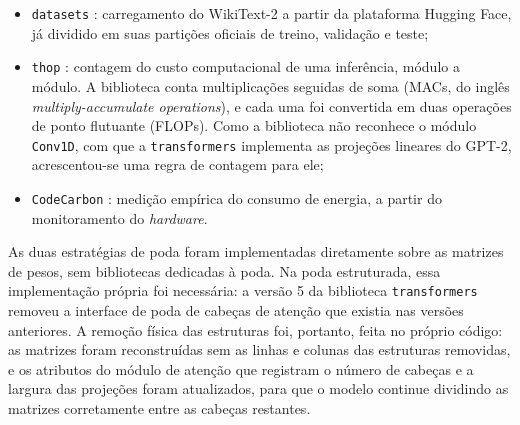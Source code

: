 \begin{itemize}
    \item \texttt{datasets} \cite{Lhoest2021}: carregamento do WikiText-2 a partir da
          plataforma Hugging Face, já dividido em suas partições oficiais de treino,
          validação e teste;
    \item \texttt{thop} \cite{Zhu2022}: contagem do custo computacional de uma inferência,
          módulo a módulo. A biblioteca conta multiplicações seguidas de
          soma (MACs, do inglês \textit{multiply-accumulate operations}), e cada uma foi
          convertida em duas operações de ponto flutuante (FLOPs). Como a biblioteca não
          reconhece o módulo \texttt{Conv1D}, com que a \texttt{transformers} implementa as
          projeções lineares do GPT-2, acrescentou-se uma regra de contagem para ele;
    \item \texttt{CodeCarbon} \cite{CodeCarbon2023}: medição empírica do consumo de
          energia, a partir do monitoramento do \textit{hardware}.
\end{itemize}

As duas estratégias de poda foram implementadas diretamente sobre as matrizes de pesos,
sem bibliotecas dedicadas à poda. Na poda estruturada, essa implementação própria foi
necessária: a versão 5 da biblioteca \texttt{transformers} removeu a interface de poda de
cabeças de atenção que existia nas versões anteriores. A remoção física das estruturas
foi, portanto, feita no próprio código: as matrizes foram reconstruídas sem as linhas e
colunas das estruturas removidas, e os atributos do módulo de atenção que registram o
número de cabeças e a largura das projeções foram atualizados, para que o modelo continue
dividindo as matrizes corretamente entre as cabeças restantes.

